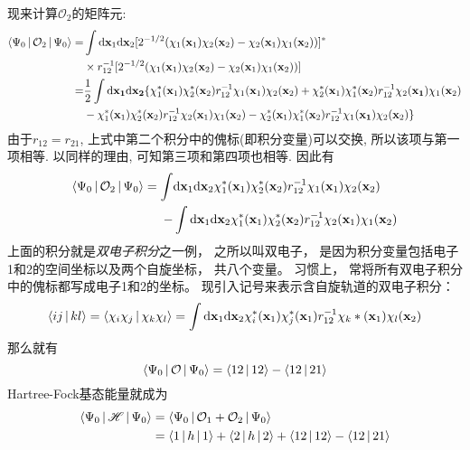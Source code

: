 
现来计算$\mathcal{O}_2$的矩阵元:
\begin{align}
\braket{\Psi_0|\mathcal{O}_2|\Psi_0}=&\int\dd\mathbf{x}_1\dd\mathbf{x}_2[2^{-1/2}(\chi_1(\mathbf{x}_1)\chi_2(\mathbf{x}_2)-\chi_2(\mathbf{x}_1)\chi_1(\mathbf{x}_2))]^*\notag\\
\qquad&\times r_{12}^{-1} [2^{-1/2}(\chi_1(\mathbf{x}_1)\chi_2(\mathbf{x}_2)-\chi_2(\mathbf{x}_1)\chi_1(\mathbf{x}_2))]\notag\\
=&\frac{1}{2}\int\dd{\mathbf{x}_1}\dd{\mathbf{x}_2}\{\chi_1^*(\mathbf{x}_1)\chi_2^*(\mathbf{x}_2)r_{12}^{-1}\chi_1(\mathbf{x}_1)\chi_2(\mathbf{x}_2) + \chi_2^*(\mathbf{x}_1)\chi_1^*(\mathbf{x}_2)r_{12}^{-1}\chi_2(\mathbf{x_1})\chi_1(\mathbf{x}_2) \notag\\
\qquad& - \chi_1^*(\mathbf{x}_1)\chi_2^*(\mathbf{x}_2)r_{12}^{-1}\chi_2(\mathbf{x}_1)\chi_1(\mathbf{x}_2) - \chi_2^*(\mathbf{x}_1)\chi_1^*(\mathbf{x}_2)r_{12}^{-1}\chi_1(\mathbf{x_1})\chi_2(\mathbf{x}_2)
\}
\end{align}
由于$r_{12}=r_{21}$, 
上式中第二个积分中的傀标(即积分变量)可以交换, 
所以该项与第一项相等. 
以同样的理由, 
可知第三项和第四项也相等. 
因此有
\begin{align}
\braket{\Psi_0|\mathcal{O}_2|\Psi_0}=\int&\dd\mathbf{x}_1\dd\mathbf{x}_2 \chi_1^*(\mathbf{x}_1)\chi_2^*(\mathbf{x}_2)r_{12}^{-1}\chi_1(\mathbf{x}_1)\chi_2(\mathbf{x}_2)\notag\\
 -& \int\dd\mathbf{x}_1\dd\mathbf{x}_2\chi_1^*(\mathbf{x}_1)\chi_2^*(\mathbf{x}_2)r_{12}^{-1}\chi_2(\mathbf{x}_1)\chi_1(\mathbf{x}_2)
\end{align}
上面的积分就是\emph{双电子积分}之一例，
之所以叫双电子，
是因为积分变量包括电子1和2的空间坐标以及两个自旋坐标，
共八个变量。
习惯上，
常将所有双电子积分中的傀标都写成电子1和2的坐标。
现引入记号来表示含自旋轨道的双电子积分：
\begin{equation}
\braket{ij|kl}=\braket{\chi_i\chi_j|\chi_k\chi_l}=\int\dd\mathbf{x}_1\dd\mathbf{x}_2\chi_i^*(\mathbf{x}_1)\chi_j^*(\mathbf{x}_1)r_{12}^{-1}\chi_k*(\mathbf{x}_1)\chi_l(\mathbf{x}_2)
\label{2.90}
\end{equation}
那么就有
\begin{equation}
\Braket{\Psi_0|\mathcal{O}|\Psi_0}=\Braket{12|12}-\Braket{12|21}
\end{equation}
Hartree-Fock基态能量就成为
\begin{align}
\Braket{\Psi_0|\mathscr{H}|\Psi_0}&=\Braket{\Psi_0|\mathcal{O}_1+\mathcal{O}_2|\Psi_0}\notag\\
&=\Braket{1|h|1}+\Braket{2|h|2}+\Braket{12|12}-\Braket{12|21}
\end{align}

